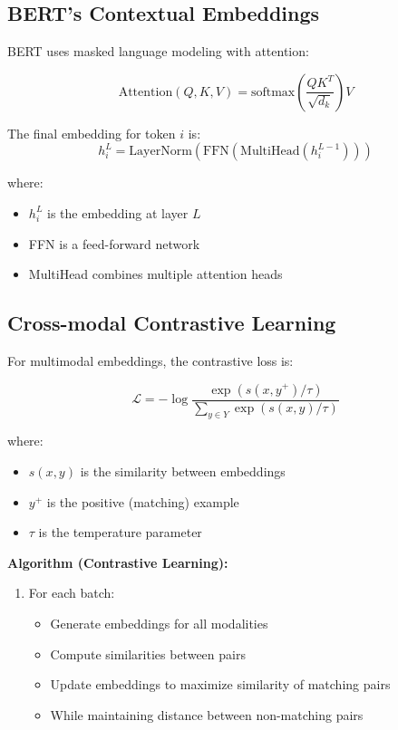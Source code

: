 \documentclass{article}
\begin{document}
\subsection{BERT's Contextual Embeddings}
BERT uses masked language modeling with attention:

\begin{equation*}
\text{Attention}(Q, K, V) = \text{softmax}(\frac{QK^T}{\sqrt{d_k}})V
\end{equation*}

The final embedding for token $i$ is:
\begin{equation*}
h_i^L = \text{LayerNorm}(\text{FFN}(\text{MultiHead}(h_i^{L-1})))
\end{equation*}

where:
\begin{itemize}
\item $h_i^L$ is the embedding at layer $L$
\item FFN is a feed-forward network
\item MultiHead combines multiple attention heads
\end{itemize}

\subsection{Cross-modal Contrastive Learning}
For multimodal embeddings, the contrastive loss is:

\begin{equation*}
\mathcal{L} = -\log \frac{\exp(s(x,y^+)/\tau)}{\sum_{y \in Y} \exp(s(x,y)/\tau)}
\end{equation*}

where:
\begin{itemize}
\item $s(x,y)$ is the similarity between embeddings
\item $y^+$ is the positive (matching) example
\item $\tau$ is the temperature parameter
\end{itemize}

\textbf{Algorithm (Contrastive Learning):}
\begin{enumerate}
\item For each batch:
   \begin{itemize}
   \item Generate embeddings for all modalities
   \item Compute similarities between pairs
   \item Update embeddings to maximize similarity of matching pairs
   \item While maintaining distance between non-matching pairs
   \end{itemize}
\end{enumerate}
\end{document}
